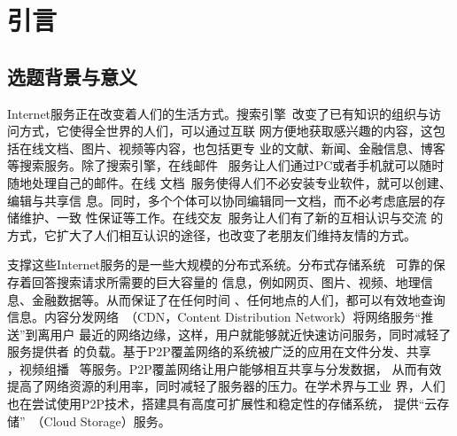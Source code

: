\chapter{引言}
\label{chap:intro}




\section{选题背景与意义}




Internet服务正在改变着人们的生活方式。搜索引擎~\cite{google, yahoo,
baidu}改变了已有知识的组织与访问方式，它使得全世界的人们，可以通过互联
网方便地获取感兴趣的内容，这包括在线文档、图片、视频等内容，也包括更专
业的文献、新闻、金融信息、博客等搜索服务。除了搜索引擎，在线邮件~
\cite{gmail}服务让人们通过PC或者手机就可以随时随地处理自己的邮件。在线
文档~\cite{gdoc}服务使得人们不必安装专业软件，就可以创建、编辑与共享信
息。同时，多个个体可以协同编辑同一文档，而不必考虑底层的存储维护、一致
性保证等工作。在线交友~\cite{facebook}服务让人们有了新的互相认识与交流
的方式，它扩大了人们相互认识的途径，也改变了老朋友们维持友情的方式。


支撑这些Internet服务的是一些大规模的分布式系统。分布式存储系统~
\cite{gfs, bigtable, dynamo}可靠的保存着回答搜索请求所需要的巨大容量的
信息，例如网页、图片、视频、地理信息、金融数据等。从而保证了在任何时间
、任何地点的人们，都可以有效地查询信息。内容分发网络~\cite{akamai,
coral}（CDN，Content Distribution Network）将网络服务“推送”到离用户
最近的网络边缘，这样，用户就能够就近快速访问服务，同时减轻了服务提供者
的负载。基于P2P覆盖网络的系统被广泛的应用在文件分发、共享~
\cite{bittorrent, sharkfs}，视频组播~ \cite{chainsaw, coolstreaming,
bullet, splitstream}等服务。P2P覆盖网络让用户能够相互共享与分发数据，
从而有效提高了网络资源的利用率，同时减轻了服务器的压力。在学术界与工业
界，人们也在尝试使用P2P技术，搭建具有高度可扩展性和稳定性的存储系统，
提供“云存储”~\cite{s3, idisk}（Cloud Storage）服务。

